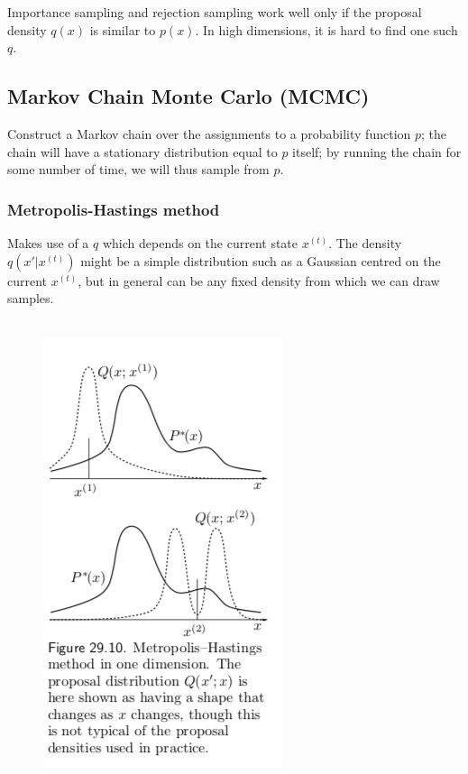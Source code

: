 \documentclass[11pt]{article}
\begin{document}
\remark
Importance sampling and rejection sampling work well only if the proposal density $q(x)$ is similar to $p(x)$. In high dimensions, it is hard to find one such $q$.

\subsection{Markov Chain Monte Carlo (MCMC)}
Construct a Markov chain over the assignments to a probability function $p$; the chain will have a stationary distribution equal to $p$ itself; by running the chain for some number of time, we will thus sample from $p$.

\subsubsection{Metropolis-Hastings method}
Makes use of a  $q$ which depends on the current state $x^{(t)}$. The density $q(x'|x^{(t)})$ might be a simple distribution such as a Gaussian centred on the current $x^{(t)}$, but in general can be any fixed density from which we can draw samples.
\remark
{}\\\\
\begin{figure}[H]
	\centering
	\includegraphics[scale=0.6]{p11.png}
\end{figure}
\end{document}
